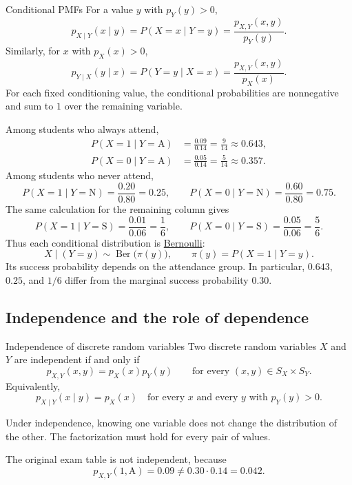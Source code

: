 \documentclass[a4paper,12pt,oneside]{report}
\begin{document}
\begin{frameddefn}{Conditional PMFs}
\label{def:conditional-pmfs}
For a value $y$ with $p_Y(y)>0$,
\[
  p_{X\mid Y}(x\mid y)
    =P(X=x\mid Y=y)
    =\frac{p_{X,Y}(x,y)}{p_Y(y)}.
\]
Similarly, for $x$ with $p_X(x)>0$,
\[
  p_{Y\mid X}(y\mid x)
    =P(Y=y\mid X=x)
    =\frac{p_{X,Y}(x,y)}{p_X(x)}.
\]
For each fixed conditioning value, the conditional probabilities
are nonnegative and sum to $1$ over the remaining variable.
\end{frameddefn}

Among students who always attend,
\begin{align*}
  P(X=1\mid Y=\mathrm A)&=\frac{0.09}{0.14}
    =\frac9{14}\approx0.643,\\
  P(X=0\mid Y=\mathrm A)&=\frac{0.05}{0.14}
    =\frac5{14}\approx0.357.
\end{align*}
Among students who never attend,
\[
  P(X=1\mid Y=\mathrm N)=\frac{0.20}{0.80}=0.25,
  \qquad
  P(X=0\mid Y=\mathrm N)=\frac{0.60}{0.80}=0.75.
\]
The same calculation for the remaining column gives
\[
  P(X=1\mid Y=\mathrm S)=\frac{0.01}{0.06}=\frac16,
  \qquad
  P(X=0\mid Y=\mathrm S)=\frac{0.05}{0.06}=\frac56.
\]
Thus each conditional distribution is
\hyperref[sec:bernoulli-distribution]{Bernoulli}:
\[
  X\mid(Y=y)\sim\operatorname{Ber}\bigl(\pi(y)\bigr),
  \qquad \pi(y)=P(X=1\mid Y=y).
\]
Its success probability depends on the attendance group.
In particular, $0.643$, $0.25$, and $1/6$ differ from the
marginal success probability $0.30$.

\clearpage
\subsection{Independence and the role of dependence}
\label{sec:random-vector-independence}

\begin{frameddefn}{Independence of discrete random variables}
Two discrete random variables $X$ and $Y$ are independent if
and only if
\[
  p_{X,Y}(x,y)=p_X(x)p_Y(y)
  \qquad\text{for every }(x,y)\in S_X\times S_Y.
\]
Equivalently,
\[
  p_{X\mid Y}(x\mid y)=p_X(x)
  \quad\text{for every }x
  \text{ and every }y\text{ with }p_Y(y)>0.
\]
\end{frameddefn}

Under independence, knowing one variable does not change the
distribution of the other. The factorization must hold for
every pair of values.

The original exam table is not independent, because
\[
  p_{X,Y}(1,\mathrm A)=0.09
  \neq 0.30\cdot0.14=0.042.
\]
\end{document}
